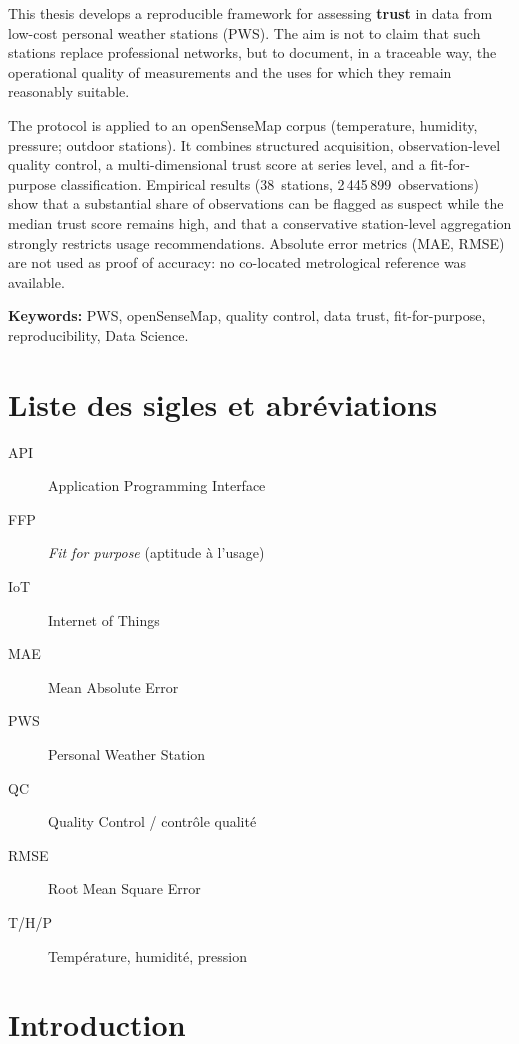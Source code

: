 \documentclass[12pt,a4paper]{report}
\begin{document}
This thesis develops a reproducible framework for assessing \textbf{trust} in
data from low-cost personal weather stations (PWS). The aim is not to claim
that such stations replace professional networks, but to document, in a
traceable way, the operational quality of measurements and the uses for which
they remain reasonably suitable.

The protocol is applied to an openSenseMap corpus (temperature, humidity,
pressure; outdoor stations). It combines structured acquisition, observation-level
quality control, a multi-dimensional trust score at series level, and a
fit-for-purpose classification. Empirical results (38~stations,
2\,445\,899~observations) show that a substantial share of observations can be
flagged as suspect while the median trust score remains high, and that a
conservative station-level aggregation strongly restricts usage
recommendations. Absolute error metrics (MAE, RMSE) are not used as proof of
accuracy: no co-located metrological reference was available.

\textbf{Keywords:} PWS, openSenseMap, quality control, data trust,
fit-for-purpose, reproducibility, Data Science.
\cleardoublepage

\chapter*{Liste des sigles et abréviations}
\begin{description}
  \item[API] Application Programming Interface
  \item[FFP] \textit{Fit for purpose} (aptitude à l'usage)
  \item[IoT] Internet of Things
  \item[MAE] Mean Absolute Error
  \item[PWS] Personal Weather Station
  \item[QC] Quality Control / contrôle qualité
  \item[RMSE] Root Mean Square Error
  \item[T/H/P] Température, humidité, pression
\end{description}
\cleardoublepage

\chapter*{Introduction}
\label{chap:introduction}
\end{document}
